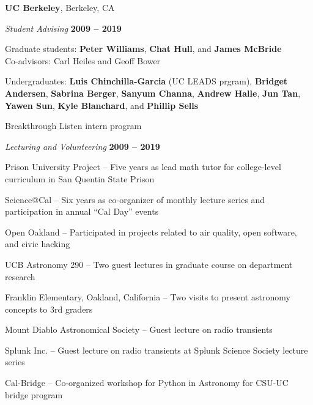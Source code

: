\documentclass[11pt]{article}
\newcommand{\halfblankline}{\quad\vspace{-0.5\baselineskip}\pagebreak[3]}
\begin{document}
\halfblankline

\textbf{UC Berkeley}, Berkeley, CA
\begin{outerlist}
\item[] \textit{Student Advising}
    \hfill \textbf{2009 -- 2019}
    \begin{innerlist}
      \item Graduate students: \textbf{Peter Williams}, \textbf{Chat Hull}, and \textbf{James McBride} \\
        Co-advisors: Carl Heiles and Geoff Bower %
      \item Undergraduates: \textbf{Luis Chinchilla-Garcia} (UC LEADS prgram), \textbf{Bridget Andersen}, \textbf{Sabrina Berger}, \textbf{Sanyum Channa}, \textbf{Andrew Halle}, \textbf{Jun Tan}, \textbf{Yawen Sun}, \textbf{Kyle Blanchard}, and \textbf{Phillip Sells}  %
      \item Breakthrough Listen intern program
     \end{innerlist}

\item[] \textit{Lecturing and Volunteering}
    \hfill \textbf{2009 -- 2019}
    \begin{innerlist}
        \item Prison University Project -- Five years as lead math tutor for college-level curriculum in San Quentin State Prison
        \item Science@Cal -- Six years as co-organizer of monthly lecture series and participation in annual ``Cal Day'' events
        \item Open Oakland -- Participated in projects related to air quality, open software, and civic hacking
        \item UCB Astronomy 290 -- Two guest lectures in graduate course on department research
        \item Franklin Elementary, Oakland, California -- Two visits to present astronomy concepts to 3rd graders
        \item Mount Diablo Astronomical Society -- Guest lecture on radio transients
        \item Splunk Inc. -- Guest lecture on radio transients at Splunk Science Society lecture series
        \item Cal-Bridge -- Co-organized workshop for Python in Astronomy for CSU-UC bridge program
    \end{innerlist}

\end{outerlist}
\end{document}

